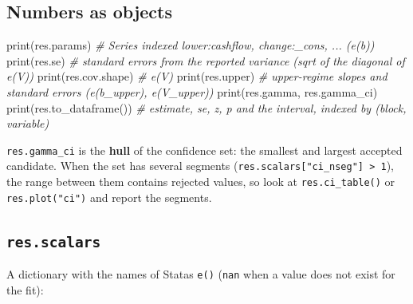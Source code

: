 \documentclass[
  10.5pt,
  a4paper,
]{article}
\newenvironment{Shaded}{}{}
\newcommand{\BuiltInTok}[1]{\textcolor[rgb]{0.00,0.50,0.00}{#1}}
\newcommand{\CommentTok}[1]{\textcolor[rgb]{0.38,0.63,0.69}{\textit{#1}}}
\newcommand{\NormalTok}[1]{#1}
\begin{document}
\subsection{Numbers as objects}\label{numbers-as-objects}

\begin{Shaded}
\begin{Highlighting}[]
\BuiltInTok{print}\NormalTok{(res.params)  }\CommentTok{\# Series indexed \textquotesingle{}lower:cashflow\textquotesingle{}, \textquotesingle{}change:\_cons\textquotesingle{}, ... (e(b))}
\BuiltInTok{print}\NormalTok{(res.se)  }\CommentTok{\# standard errors from the reported variance (sqrt of the diagonal of e(V))}
\BuiltInTok{print}\NormalTok{(res.cov.shape)  }\CommentTok{\# e(V)}
\BuiltInTok{print}\NormalTok{(res.upper)  }\CommentTok{\# upper{-}regime slopes and standard errors (e(b\_upper), e(V\_upper))}
\BuiltInTok{print}\NormalTok{(res.gamma, res.gamma\_ci)}
\BuiltInTok{print}\NormalTok{(res.to\_dataframe())  }\CommentTok{\# estimate, se, z, p and the interval, indexed by (block, variable)}
\end{Highlighting}
\end{Shaded}

\texttt{res.gamma\_ci} is the \textbf{hull} of the confidence set: the
smallest and largest accepted candidate. When the set has several
segments (\texttt{res.scalars{[}"ci\_nseg"{]}\ \textgreater{}\ 1}), the
range between them contains rejected values, so look at
\texttt{res.ci\_table()} or \texttt{res.plot("ci")} and report the
segments.

\subsection{\texorpdfstring{\texttt{res.scalars}}{res.scalars}}\label{res.scalars}

A dictionary with the names of Stata\textquotesingle s \texttt{e()}
(\texttt{nan} when a value does not exist for the fit):
\end{document}
